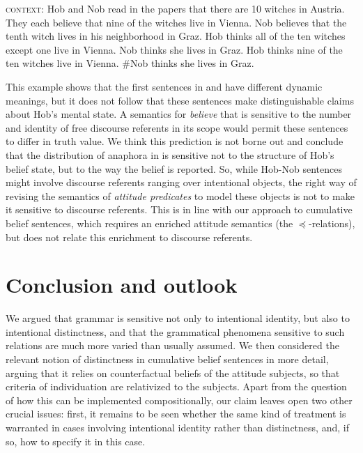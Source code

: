 \documentclass[output=paper]{langscibook}
\begin{document}
\eanoraggedright \label{sch-has:ex:52}
\eanoraggedright \label{sch-has:ex:52a} \textsc{context}: Hob and Nob read in the papers that there are 10 witches in Austria. They each  believe that nine of the witches live in Vienna. Nob believes that the tenth witch lives in his neighborhood in Graz.
\ex \label{sch-has:ex:52b} Hob thinks all of the ten witches except one live in Vienna. Nob thinks she lives in Graz.
\ex \label{sch-has:ex:52c} Hob thinks nine of the ten witches live in Vienna. \#Nob thinks she lives in Graz. \z
\z

\noindent This example shows that the first sentences in  and  have different dynamic meanings, but it does not follow that these sentences make distinguishable claims about Hob's mental state. A semantics for \textit{believe} that is sensitive to the number and identity of free discourse referents in its scope would permit these sentences to differ in truth value. We think this prediction is not borne out %
and conclude that the distribution of anaphora in  is sensitive not to the structure of Hob's belief state, but to the way the belief is reported. So, while Hob-Nob sentences might involve discourse referents ranging over intentional objects, the right way of revising the semantics of \textit{attitude predicates} to model these objects is not to make it sensitive to discourse referents. This is in line with our approach to cumulative belief sentences, which requires an enriched attitude semantics (the $\preceq$-relations), but does not relate this enrichment to discourse referents. 

\section{Conclusion and outlook}

We argued that grammar is sensitive not only to intentional identity, but also to intentional distinctness, and that the grammatical phenomena sensitive to such relations are much more varied than usually assumed. We then considered the relevant notion of distinctness in cumulative belief sentences in more detail, arguing that it relies on counterfactual beliefs of the attitude subjects, so that criteria of individuation are relativized to the subjects. Apart from the question of how this can be implemented compositionally, our claim leaves open two other crucial issues: first, it remains to be seen whether the same  kind of treatment is warranted in cases involving intentional identity rather than distinctness, and, if so, how to specify it in this case. 
\end{document}
